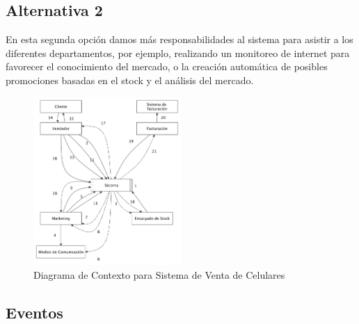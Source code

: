 \subsection{Alternativa 2}

En esta segunda opción damos más responsabilidades al sistema para asistir a los 
diferentes departamentos, por ejemplo, realizando un monitoreo de internet para 
favorecer el conocimiento del mercado, o la creación automática de posibles 
promociones basadas en el stock y el análisis del mercado.

\begin{figure}[h!]
  \centering
  \includegraphics[width=0.5\textwidth]{./imagenes/contexto_1.pdf}
  \caption{Diagrama de Contexto para Sistema de Venta de Celulares}
\end{figure}

\subsection{Eventos}

